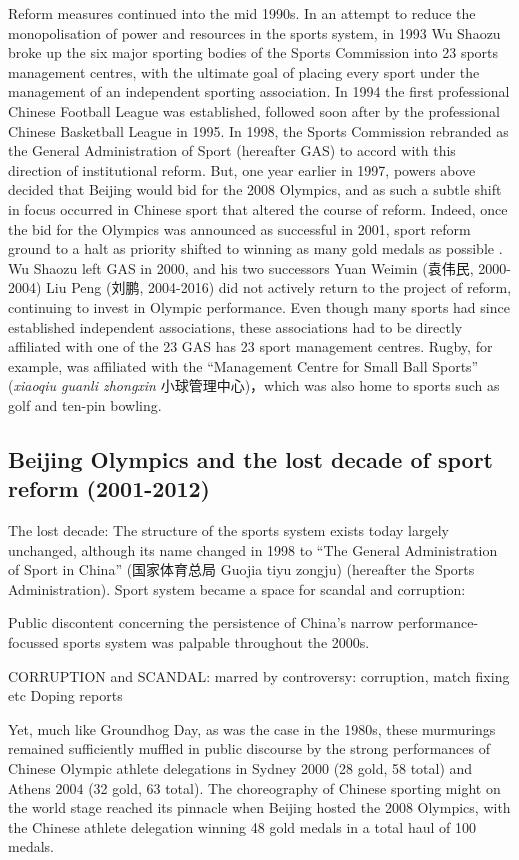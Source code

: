 {Reform measures continued into the mid 1990s. In an attempt to reduce the monopolisation of power and resources in the sports system, in 1993 Wu Shaozu broke up the six major sporting bodies of the Sports Commission into 23 sports management centres, with the ultimate goal of placing every sport under the management of an independent sporting association. In 1994 the first professional Chinese Football League was established, followed soon after by the professional Chinese Basketball League in 1995. In 1998, the Sports Commission rebranded as the General Administration of Sport (hereafter GAS) to accord with this direction of institutional reform.  But, one year earlier in 1997, powers above decided that Beijing would bid for the 2008 Olympics, and as such a subtle shift in focus occurred in Chinese sport that altered the course of reform.  Indeed, once the bid for the Olympics was announced as successful in 2001, sport reform ground to a halt as priority shifted to winning as many gold medals as possible \citep{News2017}.  Wu Shaozu left GAS in 2000, and his two successors Yuan Weimin (袁伟民, 2000-2004) Liu Peng (刘鹏, 2004-2016) did not actively return to the project of reform, continuing to invest in Olympic performance.  Even though many sports had since established independent associations, these associations had to be directly affiliated with one of the 23 GAS has 23 sport management centres. Rugby, for example, was affiliated with the ``Management Centre for Small Ball Sports'' (\textit{xiaoqiu guanli zhongxin} 小球管理中心)，which was also home to sports such as golf and ten-pin bowling.

\subsection{Beijing Olympics and the lost decade of sport reform (2001-2012)}
    The lost decade:
    The structure of the sports system exists today largely unchanged, although its name changed in 1998 to “The General Administration of Sport in China” (国家体育总局 Guojia tiyu zongju) (hereafter the Sports Administration).
    Sport system became a space for scandal and corruption:

    Public discontent concerning the persistence of China's narrow performance-focussed sports system was palpable throughout the 2000s.

    CORRUPTION and SCANDAL:
    marred by controversy:
    corruption, match fixing etc
    Doping reports

    Yet, much like Groundhog Day, as was the case in the 1980s, these murmurings remained sufficiently muffled in public discourse by the strong performances of Chinese Olympic athlete delegations in Sydney 2000 (28 gold, 58 total) and Athens 2004 (32 gold, 63 total). The choreography of Chinese sporting might on the world stage reached its pinnacle when Beijing hosted the 2008 Olympics, with the Chinese athlete delegation winning 48 gold medals in a total haul of 100 medals.

}
